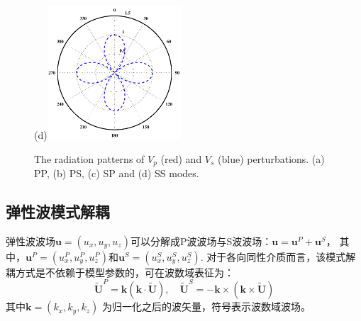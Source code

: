 \begin{figure}
\begin{center}
        \subfloat(d){\includegraphics[width=5cm]{Figure/chapter02/radiationpattern/Fig/SS.pdf}}
        \caption{The radiation patterns of $V_p$
        (red) and $V_s$ (blue) perturbations. (a) PP, (b) PS, (c) SP and (d) SS modes.
    }
    \label{fig:radiationpattern} 
    \end{center}
\end{figure} 

\subsection{弹性波模式解耦}
弹性波波场$\mathbf{u}=(u_x,u_y,u_z)$可以分解成P波波场与S波波场：$\mathbf{u}=\mathbf{u}^P+\mathbf{u}^S$，
其中，$\mathbf{u}^P=(u^P_x,u^P_y,u^P_z)$和$\mathbf{u}^S=(u^S_x,u^S_y,u^S_z)$.
对于各向同性介质而言，该模式解耦方式是不依赖于模型参数的，可在波数域表征为\cite[]{zhang.mcmechan:2010}：
\begin{equation}
        \tilde{\mathbf U}^P=\mathbf k(\mathbf k\cdot \tilde{\mathbf U}), \quad
        \tilde{\mathbf U}^S=-\mathbf 
        k\times(\mathbf k\times \tilde{\mathbf U})
\label{eq:Decomp}
\end{equation}
其中$\mathbf k=(k_x,k_y,k_z)$ 为归一化之后的波矢量，符号$\tilde{}$表示波数域波场。

